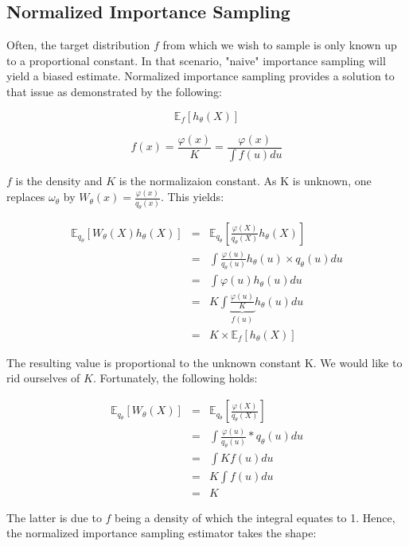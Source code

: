 \subsection{Normalized Importance Sampling}


Often, the target distribution $f$ from which we wish to sample is only known up to a proportional constant. In that scenario, "naive" importance sampling will yield a biased estimate. Normalized importance sampling provides a solution to that issue as demonstrated by the following: 

$$\mathbb E_f \left[ h_\theta(X) \right]$$

$$f(x) = \frac{\varphi(x)}{K} = \frac{\varphi(x)}{ \int f(u) du}$$

$f$ is the density and $K$ is the normalizaion constant. As K is unknown, one replaces $\omega_\theta$ by $W_\theta(x) = \frac{\varphi(x)}{q_\theta(x)}$. 
This yields:

$$
\begin{array}{rcl}
\mathbb E_{q_\theta}\left[ W_\theta(X) h_\theta(X) \right] &=& \mathbb E_{q_\theta}\left[ \frac{\varphi(X)}{q_\theta(X)} h_\theta(X) \right]
\\
&=& \displaystyle\int \frac{\varphi(u)}{q_\theta(u)} h_\theta(u) \times q_\theta(u) du
\\
&=& \displaystyle\int \varphi(u) h_\theta(u)du
\\
&=& K \displaystyle\int \underbrace{\frac{\varphi(u)} K}_{f(u)} h_\theta(u)du
\\
&=& K \times \mathbb E_{f}\left[ h_\theta(X) \right]
\end{array}$$

The resulting value is proportional to the unknown constant K. We would like to rid ourselves of $K$. Fortunately, the following holds:

$$
\begin{array}{rcl}
\mathbb E_{q_\theta}\left[ W_\theta(X) \right] 
&=& \mathbb E_{q_\theta}\left[ \frac{\varphi(X)}{q_\theta(X)} \right]
\\
&=&
\displaystyle \int \frac{\varphi(u)}{q_\theta(u)} * q_\theta(u) du 
\\
&=&
\displaystyle\int K f(u) du 
\\
&=& K \displaystyle\int f(u) du 
\\
&=& K
\end{array}
$$

The latter is due to $f$ being a density of which the integral equates to 1. Hence, the normalized importance sampling estimator takes the shape: 

